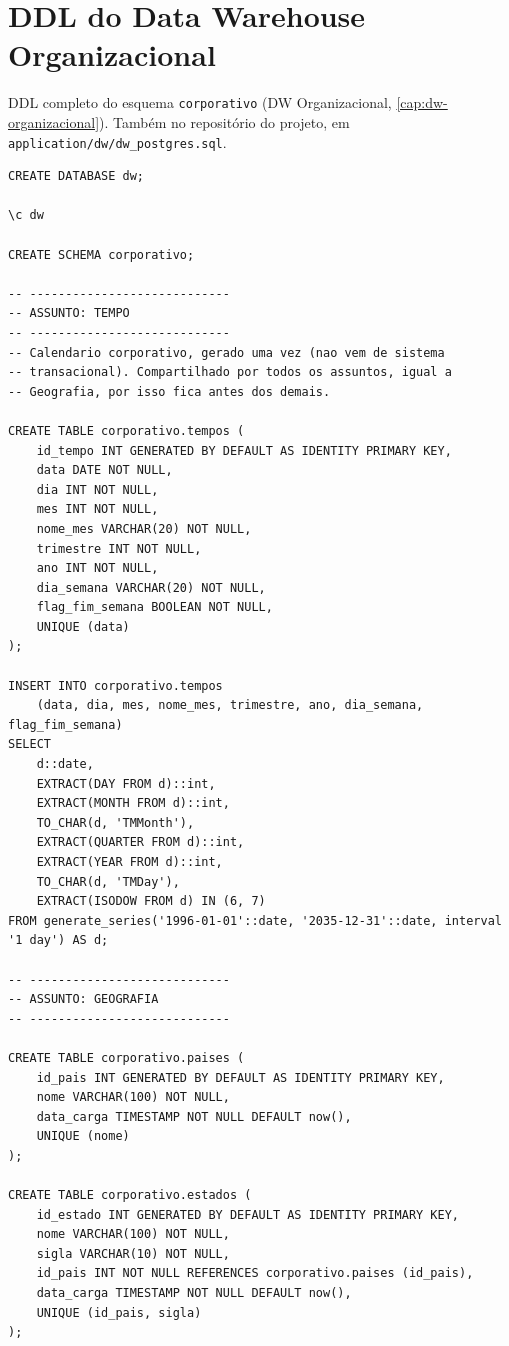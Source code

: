 \chapter{DDL do Data Warehouse Organizacional}
\label{apend:ddl-dw}

DDL completo do esquema \texttt{corporativo} (DW Organizacional, \autoref{cap:dw-organizacional}). Também no repositório do projeto, em \texttt{application/dw/dw\_postgres.sql}.

{\footnotesize
\begin{verbatim}
CREATE DATABASE dw;

\c dw

CREATE SCHEMA corporativo;

-- ----------------------------
-- ASSUNTO: TEMPO
-- ----------------------------
-- Calendario corporativo, gerado uma vez (nao vem de sistema
-- transacional). Compartilhado por todos os assuntos, igual a
-- Geografia, por isso fica antes dos demais.

CREATE TABLE corporativo.tempos (
    id_tempo INT GENERATED BY DEFAULT AS IDENTITY PRIMARY KEY,
    data DATE NOT NULL,
    dia INT NOT NULL,
    mes INT NOT NULL,
    nome_mes VARCHAR(20) NOT NULL,
    trimestre INT NOT NULL,
    ano INT NOT NULL,
    dia_semana VARCHAR(20) NOT NULL,
    flag_fim_semana BOOLEAN NOT NULL,
    UNIQUE (data)
);

INSERT INTO corporativo.tempos
    (data, dia, mes, nome_mes, trimestre, ano, dia_semana, flag_fim_semana)
SELECT
    d::date,
    EXTRACT(DAY FROM d)::int,
    EXTRACT(MONTH FROM d)::int,
    TO_CHAR(d, 'TMMonth'),
    EXTRACT(QUARTER FROM d)::int,
    EXTRACT(YEAR FROM d)::int,
    TO_CHAR(d, 'TMDay'),
    EXTRACT(ISODOW FROM d) IN (6, 7)
FROM generate_series('1996-01-01'::date, '2035-12-31'::date, interval '1 day') AS d;

-- ----------------------------
-- ASSUNTO: GEOGRAFIA
-- ----------------------------

CREATE TABLE corporativo.paises (
    id_pais INT GENERATED BY DEFAULT AS IDENTITY PRIMARY KEY,
    nome VARCHAR(100) NOT NULL,
    data_carga TIMESTAMP NOT NULL DEFAULT now(),
    UNIQUE (nome)
);

CREATE TABLE corporativo.estados (
    id_estado INT GENERATED BY DEFAULT AS IDENTITY PRIMARY KEY,
    nome VARCHAR(100) NOT NULL,
    sigla VARCHAR(10) NOT NULL,
    id_pais INT NOT NULL REFERENCES corporativo.paises (id_pais),
    data_carga TIMESTAMP NOT NULL DEFAULT now(),
    UNIQUE (id_pais, sigla)
);


\end{verbatim}}
